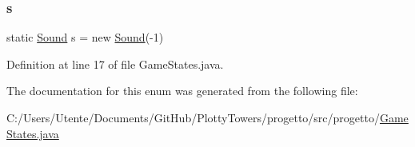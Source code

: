 \subsubsection{\texorpdfstring{s}{s}}
{\footnotesize\ttfamily  static  \hyperlink{classprogetto_1_1_sound}{Sound} s = new \hyperlink{classprogetto_1_1_sound}{Sound}(-\/1)\hspace{0.3cm}{\ttfamily [static]}}



Definition at line 17 of file Game\+States.\+java.



The documentation for this enum was generated from the following file\+:\begin{DoxyCompactItemize}
\item 
C\+:/\+Users/\+Utente/\+Documents/\+Git\+Hub/\+Plotty\+Towers/progetto/src/progetto/\hyperlink{_game_states_8java}{Game\+States.\+java}\end{DoxyCompactItemize}
